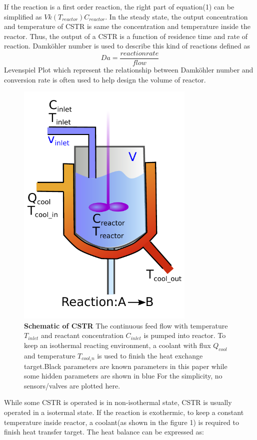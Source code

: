 \documentclass[fleqn,11pt]{wlscirep}
\begin{document}
If the reaction is a first order reaction, the right part of equation(1) can be simplified as $Vk(T_{reactor})C_{reactor}$. In the steady state,  the output concentration and temperature of CSTR is same the concentration and temperature inside the reactor. Thus, the output of a CSTR is  a function of residence time and rate of reaction. Damköhler number is used to describe this kind of reactions defined as
\begin{equation}
    Da=\frac{reaction rate}{flow}
\end{equation}
 Levenspiel Plot which represent the relationship between  Damköhler number and conversion rate  is often used to help design the volume of reactor\cite{fogler2010essentials}.
\begin{figure}[h]
    \centering
    \includegraphics[width=8.5cm]{CSTR.pdf}
    \caption{
    \textbf{Schematic of CSTR } The continuous feed flow with temperature $T_{inlet}$ and reactant concentration $C_{inlet}$ is pumped into reactor. To keep an isothermal reacting environment, a coolant with flux $Q_{cool}$ and temperature $T_{cool_in} $ is used to finish the heat exchange target.Black parameters are known parameters in this paper while some hidden parameters  are shown in blue For the simplicity, no sensors/valves are plotted here.}
    \label{fig:1}
\end{figure}

While some CSTR is operated is in non-isothermal state\cite{bruns1977nonlinear}, CSTR is usually operated in a isotermal state\cite{balakotaiah1981analysis}. If the reaction is exothermic, to keep a constant temperature inside reactor, a coolant(as shown in the figure 1) is required to finish heat transfer target. The heat balance can be expressed as:
\end{document}

